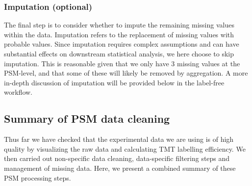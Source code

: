\documentclass[9pt,a4paper,]{extarticle}
\begin{document}
\subsubsection{Imputation (optional)}\label{imputation-optional}

The final step is to consider whether to impute the remaining missing values
within the data. Imputation refers to the replacement of missing values with
probable values. Since imputation requires complex assumptions and can have
substantial effects on downstream statistical analysis, we here choose to skip
imputation. This is reasonable given that we only have 3 missing values at the
PSM-level, and that some of these will likely be removed by aggregation. A more
in-depth discussion of imputation will be provided below in the label-free
workflow.

\subsection{Summary of PSM data cleaning}\label{summary-of-psm-data-cleaning}

Thus far we have checked that the experimental data we are using is of high
quality by visualizing the raw data and calculating TMT labelling efficiency. We
then carried out non-specific data cleaning, data-specific filtering steps and
management of missing data. Here, we present a combined summary of these PSM
processing steps.
\end{document}
